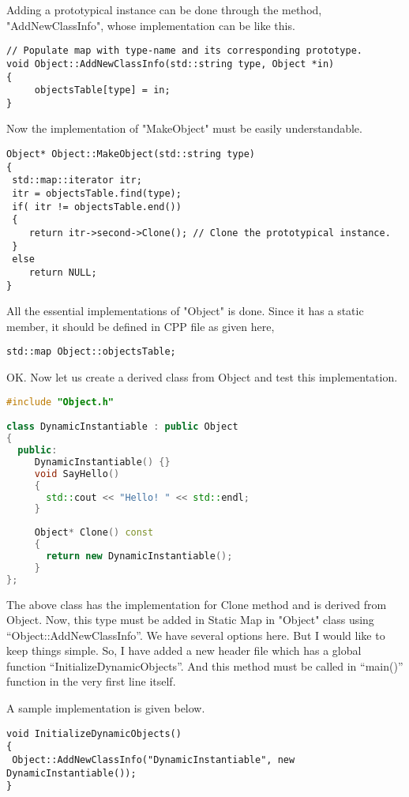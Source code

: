 \documentclass{book}
\begin{document}
Adding a prototypical instance can be done through the method, "AddNewClassInfo", whose implementation can be like this.

\begin{verbatim}
// Populate map with type-name and its corresponding prototype.
void Object::AddNewClassInfo(std::string type, Object *in)
{
     objectsTable[type] = in;
}
\end{verbatim}

Now the implementation of "MakeObject" must be easily understandable.

\begin{verbatim}
Object* Object::MakeObject(std::string type)
{
 std::map::iterator itr;
 itr = objectsTable.find(type);
 if( itr != objectsTable.end())
 {
    return itr->second->Clone(); // Clone the prototypical instance.
 }
 else
    return NULL;
}
\end{verbatim}

All the essential implementations of "Object" is done. Since it has a static member, it should be defined in CPP file as given here,

\begin{verbatim}
std::map Object::objectsTable;
\end{verbatim}

OK. Now let us create a derived class from Object and test this implementation.

\begin{lstlisting}[caption={Prototype Pattern sample DI},language=C++]
#include "Object.h"

class DynamicInstantiable : public Object
{
  public:
     DynamicInstantiable() {}
     void SayHello()
     {
       std::cout << "Hello! " << std::endl;
     }
    
     Object* Clone() const
     {
       return new DynamicInstantiable();
     }
};
\end{lstlisting}

The above class has the implementation for Clone method and is derived from Object.
Now, this type must be added in Static Map in "Object" class using ``Object::AddNewClassInfo''.
We have several options here. But I would like to keep things simple.
So, I have added a new header file which has a global function ``InitializeDynamicObjects''.
And this method must be called in ``main()'' function in the very first line itself.

A sample implementation is given below.
\begin{verbatim}
void InitializeDynamicObjects()
{
 Object::AddNewClassInfo("DynamicInstantiable", new DynamicInstantiable());
}
\end{verbatim}
\end{document}

